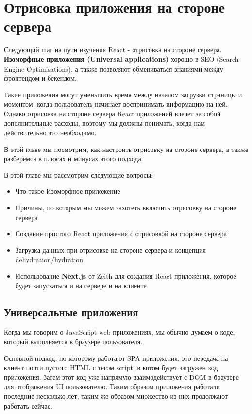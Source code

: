 \chapter{Отрисовка приложения на стороне сервера}

Следующий шаг на пути изучения React - отрисовка на стороне сервера. \textbf{Изоморфные приложения (Universal applications)} хорошо в SEO (Search Engine Optimisations), а также позволяют обмениваться знаниями между фронтендом и бекендом. 

Такие приложения могут уменьшить время между началом загрузки страницы и моментом, когда пользователь начинает воспринимать информацию на ней. Однако отрисовка на стороне сервера React приложений влечет за собой дополнительные расходы, поэтому мы должны понимать, когда нам действительно это необходимо.

В этой главе мы посмотрим, как настроить отрисовку на стороне сервера, а также разберемся в плюсах и минусах этого подхода.

В этой главе мы рассмотрим следующие вопросы:

\begin{itemize}
	\item Что такое Изоморфное приложение 
	\item Причины, по которым мы можем захотеть включить отрисовку на стороне сервера
	\item Создание простого React приложения с отрисовкой на стороне сервера
	\item Загрузка данных при отрисовке на стороне сервера и концепция dehydration/hydration
	\item Использование \textbf{Next.js} от Zeith для создания React приложения, которое будет запускаться и на сервере и на клиенте
\end{itemize}

\section{Универсальные приложения}

Когда мы говорим о JavaScript web приложениях, мы обычно думаем о коде, который выполняется в браузере пользователя.

Основной подход, по которому работают SPA приложения, это передача на клиент почти пустого HTML с тегом script, в котом будет загружен код приложения. Затем этот код уже напрямую взаимодействует с DOM в браузере для отображения UI пользователю. Таким образом приложения работали последние несколько лет, таким же образом множество из них продолжают работать сейчас. 

